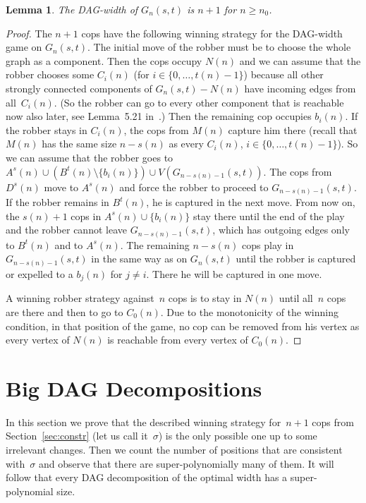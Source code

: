 \documentclass[authoryear]{article}
\newtheorem{lemma}[theorem]{Lemma}
\theoremstyle{definition}
\newcommand{\0}{\emptyset}
\newcommand{\dagw}{DAG-{}width\xspace}
\begin{document}
\begin{lemma}
  \label{lemma:dagw}
The \dagw of $G_n(s,t)$ is $n+1$ for $n\ge n_0$.
\end{lemma}
\begin{proof}
  The $n+1$ cops have the following winning strategy for the \dagw game on
  $G_n(s,t)$. The initial move of the robber must be to choose the whole graph
  as a component. Then the cops occupy $N(n)$ and we can assume that the
  robber chooses some $C_i(n)$ (for $i\in\{0,\ldots,t(n)-1\}$) because
  all other strongly connected components of $G_n(s,t) - N(n)$ have
  incoming edges from all~$C_i(n)$. (So the robber can go to every
  other component that is reachable now also later, see Lemma~5.21
  in~\cite{RabinovichPhD}.)  Then the remaining cop occupies
  $b_i(n)$. If the robber stays in $C_i(n)$, the cops from $M(n)$
  capture him there (recall that $M(n)$ has the same size $n-s(n)$ as
  every $C_i(n)$, $i\in\{0,\ldots,t(n)-1\}$). So we can assume that
  the robber goes to $A^s(n) \cup (B^t(n)\setminus\{b_i(n)\}) \cup
  V(G_{n-s(n)-1}(s,t))$. 
  The cops from $D^s(n)$ move to $A^s(n)$ and
  force the robber to proceed to $G_{n-s(n)-1}(s,t)$. If the robber
  remains in $B^t(n)$, he is captured in the next move. From now on,
  the $s(n)+1$ cops in $A^s(n) \cup \{b_i(n)\}$ stay there until the end
  of the play and the robber cannot leave $G_{n-s(n)-1}(s,t)$, which has
  outgoing edges only to $B^t(n)$ and to $A^s(n)$. The remaining $n-s(n)$ cops play in
  $G_{n-s(n)-1}(s,t)$ in the same way as on $G_n(s,t)$ until the
  robber is captured or expelled to a $b_j(n)$ for $j\neq i$. There he
  will be captured in one move.

  A winning robber strategy against~$n$ cops is to stay in $N(n)$
  until all~$n$ cops are there and then to go to $C_0(n)$. Due to
  the monotonicity of the winning condition, in that
  position of the game, no cop can be removed from his vertex as every
  vertex of $N(n)$ is reachable from every vertex of $C_0(n)$.
\end{proof}


\section{Big DAG Decompositions}\label{sec:bigdec}

In this section we prove that the described winning strategy for~$n+1$
cops from Section~\ref{sec:constr}
(let
us call it~$\sigma$) is the only possible one up to some irrelevant
changes. Then we count the number of positions that are consistent
with~$\sigma$ and observe that there are super-polynomially many of
them. It will follow that every DAG decomposition of the optimal width
has a super-polynomial size.
\end{document}
